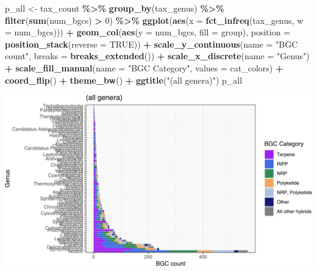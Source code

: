 \documentclass[
]{article}
\newenvironment{Shaded}{\begin{snugshade}}{\end{snugshade}}
\newcommand{\AttributeTok}[1]{\textcolor[rgb]{0.13,0.29,0.53}{#1}}
\newcommand{\ConstantTok}[1]{\textcolor[rgb]{0.56,0.35,0.01}{#1}}
\newcommand{\DecValTok}[1]{\textcolor[rgb]{0.00,0.00,0.81}{#1}}
\newcommand{\FunctionTok}[1]{\textcolor[rgb]{0.13,0.29,0.53}{\textbf{#1}}}
\newcommand{\NormalTok}[1]{#1}
\newcommand{\OtherTok}[1]{\textcolor[rgb]{0.56,0.35,0.01}{#1}}
\newcommand{\SpecialCharTok}[1]{\textcolor[rgb]{0.81,0.36,0.00}{\textbf{#1}}}
\newcommand{\StringTok}[1]{\textcolor[rgb]{0.31,0.60,0.02}{#1}}
\begin{document}
\begin{Shaded}
\begin{Highlighting}[]
\NormalTok{p\_all }\OtherTok{\textless{}{-}}\NormalTok{ tax\_count }\SpecialCharTok{\%\textgreater{}\%}
  \FunctionTok{group\_by}\NormalTok{(tax\_genus) }\SpecialCharTok{\%\textgreater{}\%}
  \FunctionTok{filter}\NormalTok{(}\FunctionTok{sum}\NormalTok{(num\_bgcs) }\SpecialCharTok{\textgreater{}} \DecValTok{0}\NormalTok{) }\SpecialCharTok{\%\textgreater{}\%}
  \FunctionTok{ggplot}\NormalTok{(}\FunctionTok{aes}\NormalTok{(}\AttributeTok{x =} \FunctionTok{fct\_infreq}\NormalTok{(tax\_genus, }\AttributeTok{w =}\NormalTok{ num\_bgcs))) }\SpecialCharTok{+}
  \FunctionTok{geom\_col}\NormalTok{(}\FunctionTok{aes}\NormalTok{(}\AttributeTok{y =}\NormalTok{ num\_bgcs, }\AttributeTok{fill =}\NormalTok{ group), }\AttributeTok{position =} \FunctionTok{position\_stack}\NormalTok{(}\AttributeTok{reverse =} \ConstantTok{TRUE}\NormalTok{)) }\SpecialCharTok{+}
  \FunctionTok{scale\_y\_continuous}\NormalTok{(}\AttributeTok{name =} \StringTok{"BGC count"}\NormalTok{, }\AttributeTok{breaks =} \FunctionTok{breaks\_extended}\NormalTok{()) }\SpecialCharTok{+}
  \FunctionTok{scale\_x\_discrete}\NormalTok{(}\AttributeTok{name =} \StringTok{"Genus"}\NormalTok{) }\SpecialCharTok{+}
  \FunctionTok{scale\_fill\_manual}\NormalTok{(}\AttributeTok{name =} \StringTok{"BGC Category"}\NormalTok{, }\AttributeTok{values =}\NormalTok{ cat\_colors) }\SpecialCharTok{+}
  \FunctionTok{coord\_flip}\NormalTok{() }\SpecialCharTok{+}
  \FunctionTok{theme\_bw}\NormalTok{() }\SpecialCharTok{+}
  \FunctionTok{ggtitle}\NormalTok{(}\StringTok{"(all genera)"}\NormalTok{)}
\NormalTok{p\_all}
\end{Highlighting}
\end{Shaded}

\includegraphics{analysis_files/figure-latex/unnamed-chunk-12-1.pdf}
\end{document}
